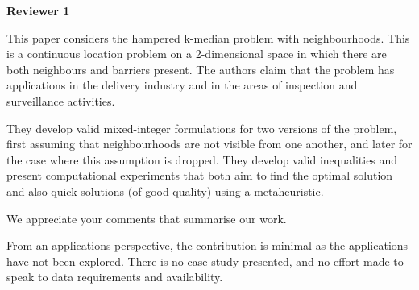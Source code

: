 \documentclass{article}
\newenvironment{reviewer}{\setcounter{pointcounter}{1}}{}
\newcommand{\point}{\text{{\selectfont \thepointcounter} \stepcounter{pointcounter}}}
\begin{document}
	\begin{reviewer}
		
		\begin{tcolorbox}[breakable,enhanced,coltitle=black,colback=red!75!black,colframe=red!75!black,borderline={1pt}{0pt}{black},boxrule=0pt]
			\textbf{Reviewer 1}
		\end{tcolorbox}
		
		\begin{itshape}
			This paper considers the hampered k-median problem with neighbourhoods. This is a continuous location problem on a 2-dimensional space in which there are both neighbours and barriers present. The authors claim that the problem has applications in the delivery industry and in the areas of inspection and surveillance activities.
			
			They develop valid mixed-integer formulations for two versions of the problem, first assuming that neighbourhoods are not visible from one another, and later for the case where this assumption is dropped. They develop valid inequalities and present computational experiments that both aim to find the optimal solution and also quick solutions (of good quality) using a metaheuristic.
		\end{itshape}
		
		\begin{tcolorbox}[breakable,enhanced,coltitle=black,colback=red!5!white,colframe=red!75!black,title=\textbf{Answer R1.\point},borderline={1pt}{0pt}{black},boxrule=0pt]
			We appreciate your comments that summarise our work.
		\end{tcolorbox}
		
		\begin{itshape}
			From an applications perspective, the contribution is minimal as the applications have not been explored. There is no case study presented, and no effort made to speak to data requirements and availability.
		\end{itshape}
		

\end{reviewer}
\end{document}
